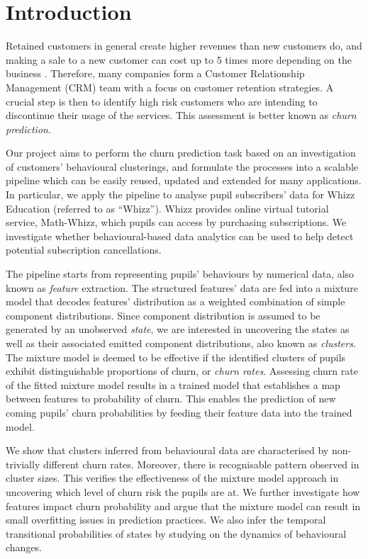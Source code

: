 \section{Introduction}
\label{sec:intro}

Retained customers in general create higher revenues than new customers do, and making a sale to a new customer can cost up to 5 times more depending on the business \cite{Slater2000}. Therefore, many companies form a Customer Relationship Management (CRM) team with a focus on customer retention strategies. A crucial step is then to identify high risk customers who are intending to discontinue their usage of the services. This assessment is better known as \textit{churn prediction}.

Our project aims to perform the churn prediction task based on an investigation of customers' behavioural clusterings, and formulate the processes into a scalable pipeline which can be easily reused, updated and extended for many applications. In particular, we apply the pipeline to analyse pupil subscribers' data for Whizz Education (referred to as ``Whizz''). Whizz provides online virtual tutorial service, Math-Whizz, which pupils can access by purchasing subscriptions. We investigate whether behavioural-based data analytics can be used to help detect potential subscription cancellations.

The pipeline starts from representing pupils' behaviours by numerical data, also known as \textit{feature} extraction. The structured features' data are fed into a mixture model that decodes features' distribution as a weighted combination of simple component distributions. Since component distribution is assumed to be generated by an unobserved \textit{state}, we are interested in uncovering the states as well as their associated emitted component distributions, also known as \textit{clusters}. The mixture model is deemed to be effective if the identified clusters of pupils exhibit distinguishable proportions of churn, or \textit{churn rates}. Assessing churn rate of the fitted mixture model results in a trained model that establishes a map between features to probability of churn. This enables the prediction of new coming pupils' churn probabilities by feeding their feature data into the trained model.

We show that clusters inferred from behavioural data are characterised by non-trivially different churn rates. Moreover, there is recognisable pattern observed in cluster sizes. This verifies the effectiveness of the mixture model approach in uncovering which level of churn risk the pupils are at. We further investigate how features impact churn probability and argue that the mixture model can result in small overfitting issues in prediction practices. We also infer the temporal transitional probabilities of states by studying on the dynamics of behavioural changes.

